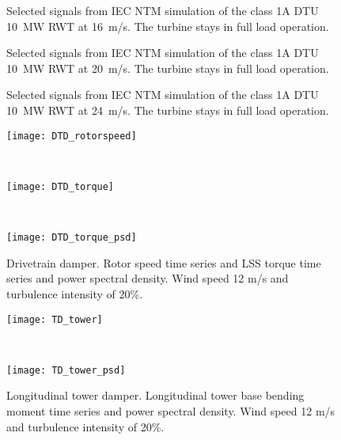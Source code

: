 \begin{figure}[t]
\centerline{ }
\caption{Selected signals from IEC NTM simulation of the class 1A DTU 10~MW RWT at 16~m/s. The turbine stays in full load operation. \label{f:16ms}}
\end{figure}


\begin{figure}[t]
\centerline{ }
\caption{Selected signals from IEC NTM simulation of the class 1A DTU 10~MW RWT at 20~m/s. The turbine stays in full load operation. \label{f:20ms}}
\end{figure}


\begin{figure}[t]
\centerline{ }
\caption{Selected signals from IEC NTM simulation of the class 1A DTU 10~MW RWT at 24~m/s. The turbine stays in full load operation. \label{f:24ms}}
\end{figure}


\begin{figure}[!t]
\begin{center}
\parbox{0.9\columnwidth}{\mbox{\texttt{[image: DTD\_rotorspeed]}}}\\
\parbox{0.9\columnwidth}{\mbox{\texttt{[image: DTD\_torque]}}}\\
\parbox{0.9\columnwidth}{\mbox{\texttt{[image: DTD\_torque\_psd]}}}
\caption{Drivetrain damper. Rotor speed time series and LSS torque time series and power spectral density. Wind speed 12 m/s and turbulence intensity of 20\%.}\label{f:DT_damper}
\end{center}
\end{figure}

\begin{figure}[t]
\begin{center}
\parbox{0.9\columnwidth}{\mbox{\texttt{[image: TD\_tower]}}}\\
\parbox{0.9\columnwidth}{\mbox{\texttt{[image: TD\_tower\_psd]}}}
\caption{Longitudinal tower damper. Longitudinal tower base bending moment time series and power spectral density. Wind speed 12 m/s and turbulence intensity of 20\%.}\label{f:TT_damper}
\end{center}
\end{figure}

